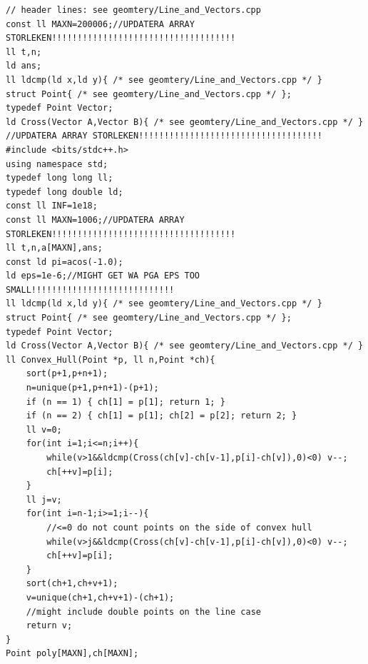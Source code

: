 \begin{lstlisting}[breaklines=true]
// header lines: see geomtery/Line_and_Vectors.cpp
const ll MAXN=200006;//UPDATERA ARRAY STORLEKEN!!!!!!!!!!!!!!!!!!!!!!!!!!!!!!!!!!!!
ll t,n;
ld ans;
ll ldcmp(ld x,ld y){ /* see geomtery/Line_and_Vectors.cpp */ }
struct Point{ /* see geomtery/Line_and_Vectors.cpp */ };
typedef Point Vector;
ld Cross(Vector A,Vector B){ /* see geomtery/Line_and_Vectors.cpp */ }
//UPDATERA ARRAY STORLEKEN!!!!!!!!!!!!!!!!!!!!!!!!!!!!!!!!!!!!
#include <bits/stdc++.h>
using namespace std;
typedef long long ll;
typedef long double ld;
const ll INF=1e18;
const ll MAXN=1006;//UPDATERA ARRAY STORLEKEN!!!!!!!!!!!!!!!!!!!!!!!!!!!!!!!!!!!!
ll t,n,a[MAXN],ans;
const ld pi=acos(-1.0);
ld eps=1e-6;//MIGHT GET WA PGA EPS TOO SMALL!!!!!!!!!!!!!!!!!!!!!!!!!!!!
ll ldcmp(ld x,ld y){ /* see geomtery/Line_and_Vectors.cpp */ }
struct Point{ /* see geomtery/Line_and_Vectors.cpp */ };
typedef Point Vector;
ld Cross(Vector A,Vector B){ /* see geomtery/Line_and_Vectors.cpp */ }
ll Convex_Hull(Point *p, ll n,Point *ch){
    sort(p+1,p+n+1);
    n=unique(p+1,p+n+1)-(p+1);
    if (n == 1) { ch[1] = p[1]; return 1; }
    if (n == 2) { ch[1] = p[1]; ch[2] = p[2]; return 2; }
    ll v=0;
    for(int i=1;i<=n;i++){
        while(v>1&&ldcmp(Cross(ch[v]-ch[v-1],p[i]-ch[v]),0)<0) v--;
        ch[++v]=p[i];
    }
    ll j=v;
    for(int i=n-1;i>=1;i--){
        //<=0 do not count points on the side of convex hull
        while(v>j&&ldcmp(Cross(ch[v]-ch[v-1],p[i]-ch[v]),0)<0) v--;
        ch[++v]=p[i];
    }
    sort(ch+1,ch+v+1);
    v=unique(ch+1,ch+v+1)-(ch+1);
    //might include double points on the line case
    return v;
}
Point poly[MAXN],ch[MAXN];
\end{lstlisting}


